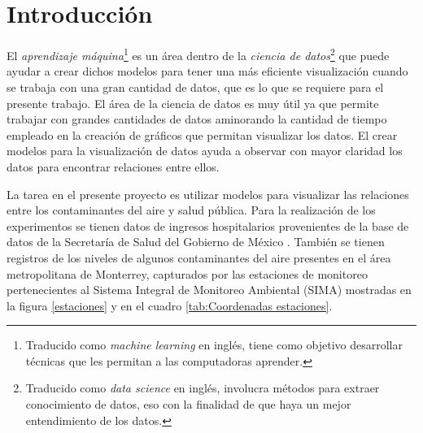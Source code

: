 \linenumbers
\chapter{Introducción}

El \emph{aprendizaje máquina}\footnote{Traducido como \emph{machine learning} en inglés, tiene como objetivo desarrollar técnicas que les permitan a las computadoras aprender.} es un área dentro de la \emph{ciencia de datos}\footnote{Traducido como \emph{data science} en inglés, involucra métodos para extraer conocimiento de datos, eso con la finalidad de que haya un mejor entendimiento de los datos.} que puede ayudar a crear dichos modelos para tener una más eficiente visualización cuando se trabaja con una gran cantidad de datos, que es lo que se requiere para el presente trabajo. El área de la ciencia de datos es muy útil ya que permite trabajar con grandes cantidades de datos aminorando la cantidad de tiempo empleado en la creación de gráficos que permitan visualizar los datos. El crear modelos para la visualización de datos ayuda a observar con mayor claridad los datos para encontrar relaciones entre ellos.


La tarea en el presente proyecto es utilizar modelos para visualizar las relaciones entre los contaminantes del aire y salud pública. Para la realización de los experimentos se tienen datos de ingresos hospitalarios provenientes de la base de datos de la Secretaría de Salud del Gobierno de México \cite{f1}. También se tienen registros de los niveles de algunos contaminantes del aire presentes en el área metropolitana de Monterrey, capturados por las estaciones de monitoreo pertenecientes al Sistema Integral de Monitoreo Ambiental (SIMA) \cite{f2} mostradas en la figura \ref{estaciones} y en el cuadro \ref{tab:Coordenadas estaciones}.

